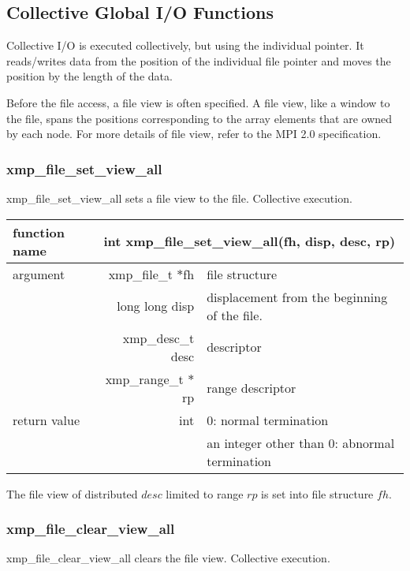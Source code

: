    \subsection{Collective Global I/O Functions}

   Collective I/O is executed collectively, but using the individual pointer.
   It reads/writes data from the position of the individual file pointer and moves the position
   by the length of the data.

   Before the file access, a file view is often specified. A file view, like a window to the file, 
   spans the positions corresponding to the array elements that are
   owned by each node. 
   For more details of file view, refer to the MPI 2.0 specification.

   \subsubsection{xmp\_file\_set\_view\_all}
   xmp\_file\_set\_view\_all sets a file view to the file. Collective execution.

   \begin{table}[h]
    \begin{center}
     \begin{tabular}{|l|r|p{70mm}|}
      \hline
      {\bf function name}  & \multicolumn{2}{c|}{\bf int xmp\_file\_set\_view\_all(fh,
      disp, desc, rp)} \\ \hline \hline
      argument & xmp\_file\_t $*$fh & file structure \\ \cline{2-3}
      & long long disp & displacement from the beginning of the file. \\ \cline{2-3}
      & xmp\_desc\_t desc & descriptor \\ \cline{2-3}
      & xmp\_range\_t $*$rp & range descriptor \\ \hline
      return value & int & 0: normal termination \\
      &  & an integer other than 0: abnormal termination \\ \hline
      \end{tabular}
     \end{center}
    \label{tb:aaa}
   \end{table}

   The file view of distributed $desc$ limited to range $rp$ is set into file structure $fh$.

   \subsubsection{xmp\_file\_clear\_view\_all}
   xmp\_file\_clear\_view\_all clears the file view. Collective execution.

